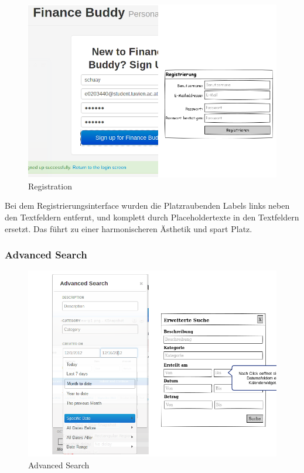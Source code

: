 \documentclass[a4paper,10pt]{article}
\begin{document}
\begin{figure}
\centering
\includegraphics[width=\textwidth]{registration}
\caption{Registration} \label{fig:registration}
\end{figure}

Bei dem Registrierungsinterface wurden die Platzraubenden Labels links neben den Textfeldern entfernt, 
und komplett durch Placeholdertexte in den Textfeldern ersetzt. Das f\"uhrt zu einer harmonischeren \"Asthetik und spart Platz.

\clearpage
\subsubsection{Advanced Search}

\begin{figure}
\centering
\includegraphics[width=\textwidth]{advanced-search}
\caption{Advanced Search} \label{fig:advanced-search}
\end{figure}
\end{document}
